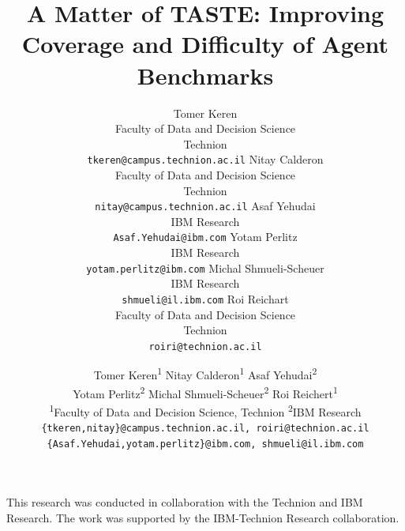 \documentclass{article}
\title{A Matter of TASTE: Improving Coverage and Difficulty of Agent Benchmarks}
\author{
  Tomer Keren \\
  Faculty of Data and Decision Science\\
  Technion\\
  \texttt{tkeren@campus.technion.ac.il} 
  \And
  Nitay Calderon \\
  Faculty of Data and Decision Science\\
  Technion\\
  \texttt{nitay@campus.technion.ac.il} 
  \And
  Asaf Yehudai \\
  IBM Research \\
  \texttt{Asaf.Yehudai@ibm.com} 
  \And
  Yotam Perlitz \\
  IBM Research \\
  \texttt{yotam.perlitz@ibm.com} 
  \And
  Michal Shmueli-Scheuer \\
  IBM Research \\
  \texttt{shmueli@il.ibm.com} 
  \And
  Roi Reichart \\
  Faculty of Data and Decision Science\\
  Technion\\
  \texttt{roiri@technion.ac.il} 
}
\author{%
Tomer Keren\textsuperscript{1} \quad
Nitay Calderon\textsuperscript{1} \quad
Asaf Yehudai\textsuperscript{2}
\\
Yotam Perlitz\textsuperscript{2} \quad
Michal Shmueli-Scheuer\textsuperscript{2} \quad
Roi Reichert\textsuperscript{1}
\\[0.5em]
\textsuperscript{1}Faculty of Data and Decision Science, Technion
\quad
\textsuperscript{2}IBM Research
\\
\texttt{\{tkeren,nitay\}@campus.technion.ac.il, roiri@technion.ac.il}
\\
\texttt{\{Asaf.Yehudai,yotam.perlitz\}@ibm.com, shmueli@il.ibm.com}
}
\begin{document}
% 
\maketitle









\begin{ack}
This research was conducted in collaboration with the Technion and IBM Research. The work was supported by the IBM-Technion Research collaboration.
\end{ack}


\newpage


\end{document}
